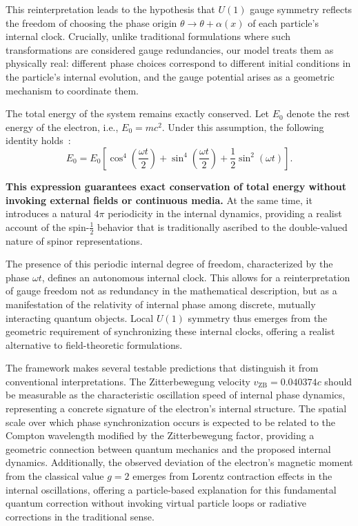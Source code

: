 \documentclass[%
 reprint,
 amsmath,amssymb,
 aps,
]{revtex4-1}
\numberwithin{equation}{section}%
\begin{document}
This reinterpretation leads to the hypothesis that $U(1)$ gauge symmetry reflects the freedom of choosing the phase origin $\theta \to \theta + \alpha(x)$ of each particle's internal clock. Crucially, unlike traditional formulations where such transformations are considered gauge redundancies, our model treats them as physically real: different phase choices correspond to different initial conditions in the particle’s internal evolution, and the gauge potential arises as a geometric mechanism to coordinate them.

The total energy of the system remains exactly conserved. Let \( E_0 \) denote the rest energy of the electron, i.e., \( E_0 = mc^2 \). Under this assumption, the following identity holds~\cite{hanamura2024quantum, hanamura2018}:
\begin{equation}
E_0 = E_0\left[\cos^4\left(\frac{\omega t}{2}\right) + \sin^4\left(\frac{\omega t}{2}\right) + \frac{1}{2}\sin^2(\omega t)\right].
\label{eq:energy_conservation}
\end{equation}

\textbf{This expression guarantees exact conservation of total energy without invoking external fields or continuous media.} At the same time, it introduces a natural $4\pi$ periodicity in the internal dynamics, providing a realist account of the spin-$\frac{1}{2}$ behavior that is traditionally ascribed to the double-valued nature of spinor representations.

The presence of this periodic internal degree of freedom, characterized by the phase \(\omega t\), defines an autonomous internal clock. This allows for a reinterpretation of gauge freedom not as redundancy in the mathematical description, but as a manifestation of the relativity of internal phase among discrete, mutually interacting quantum objects. Local $U(1)$ symmetry thus emerges from the geometric requirement of synchronizing these internal clocks, offering a realist alternative to field-theoretic formulations.

The framework makes several testable predictions that distinguish it from conventional interpretations. The Zitterbewegung velocity $v_{\text{ZB}} = 0.040374c$ should be measurable as the characteristic oscillation speed of internal phase dynamics, representing a concrete signature of the electron's internal structure. The spatial scale over which phase synchronization occurs is expected to be related to the Compton wavelength modified by the Zitterbewegung factor, providing a geometric connection between quantum mechanics and the proposed internal dynamics. Additionally, the observed deviation of the electron's magnetic moment from the classical value $g = 2$ emerges from Lorentz contraction effects in the internal oscillations, offering a particle-based explanation for this fundamental quantum correction without invoking virtual particle loops or radiative corrections in the traditional sense.
\end{document}
